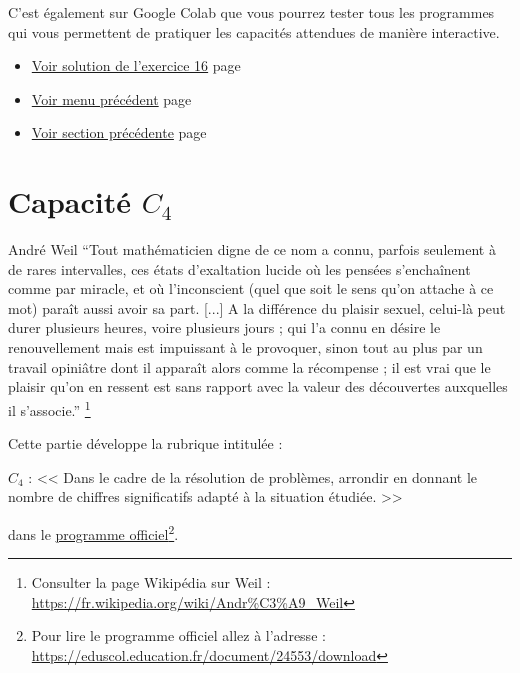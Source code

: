 \documentclass[a4paper,11pt]{book}
\begin{document}
C'est également sur Google Colab que vous pourrez tester tous les
programmes qui vous permettent de pratiquer les capacités attendues
de manière interactive.


\begin{itemize}
\item \hyperref[org2f710b4]{Voir solution de l'exercice 16}
page~\pageref{page:sec9.3.2sol16}
\item \hyperref[org67109aa]{Voir menu précédent}
page~\pageref{page:capacity3}
\item \hyperref[org8cc10b8]{Voir section précédente}
page~\pageref{page:sec3.4.1exo15}
\end{itemize}


\clearpage

\chapter{Capacité \(C_4\)}
\label{sec:orgfc1c1cd}
\label{org67b7ea7}
\label{page:sec3.5capacity4}

\begin{myquote}{André Weil}
\enquote{Tout mathématicien digne de ce nom a connu, parfois seulement à de
rares intervalles, ces états d’exaltation lucide où les pensées
s’enchaînent comme par miracle, et où l’inconscient (quel que soit
le sens qu’on attache à ce mot) paraît aussi avoir sa part. [...] A
la différence du plaisir sexuel, celui-là peut durer plusieurs
heures, voire plusieurs jours ; qui l’a connu en désire le
renouvellement mais est impuissant à le provoquer, sinon tout au
plus par un travail opiniâtre dont il apparaît alors comme la
récompense ; il est vrai que le plaisir qu’on en ressent est sans
rapport avec la valeur des découvertes auxquelles il s’associe.}
\footnote{Consulter la page Wikipédia sur Weil : \url{https://fr.wikipedia.org/wiki/Andr\%C3\%A9_Weil}}
\end{myquote}

\clearpage


Cette partie développe la rubrique intitulée :

\(C_{4}\) : << Dans le cadre de la résolution de problèmes, arrondir
en donnant le nombre de chiffres significatifs adapté à la situation
étudiée. >>

dans le \href{https://eduscol.education.fr/document/24553/download}{programme officiel}\footnote{Pour lire le programme officiel allez à l'adresse :
\url{https://eduscol.education.fr/document/24553/download}}.
\clearpage
\end{document}
